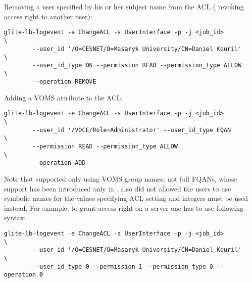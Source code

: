 Removing a user specified by his or her subject name from the ACL (\ie
revoking access right to another user):

\begin{verbatim}
glite-lb-logevent -e ChangeACL -s UserInterface -p -j <job_id>          \
        --user_id '/O=CESNET/O=Masaryk University/CN=Daniel Kouril'     \
        --user_id_type DN --permission READ --permission_type ALLOW     \
        --operation REMOVE
\end{verbatim}


Adding a VOMS attribute to the ACL:

\begin{verbatim}
glite-lb-logevent -e ChangeACL -s UserInterface -p -j <job_id>          \
        --user_id '/VOCE/Role=Administrator' --user_id_type FQAN        \
        --permission READ --permission_type ALLOW                       \
        --operation ADD
\end{verbatim}


Note that \LBold supported only using VOMS group names, not full FQANs,
whose support has been introduced only in \LBnew. \LBold also did not
allowed the users to use symbolic names for the values specifying ACL
setting and integers must be used instead. For example, to grant access
right on a \LBold server one has to use following syntax:

\begin{verbatim}
glite-lb-logevent -e ChangeACL -s UserInterface -p -j <job_id>          \
        --user_id '/O=CESNET/O=Masaryk University/CN=Daniel Kouril'     \
        --user_id_type 0 --permission 1 --permission_type 0 --operation 0
\end{verbatim}

